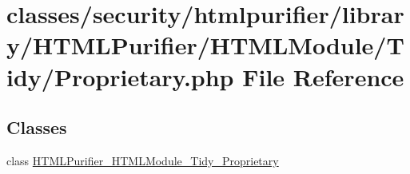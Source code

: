 \hypertarget{Tidy_2Proprietary_8php}{\section{classes/security/htmlpurifier/library/\+H\+T\+M\+L\+Purifier/\+H\+T\+M\+L\+Module/\+Tidy/\+Proprietary.php File Reference}
\label{Tidy_2Proprietary_8php}
}
\subsection*{Classes}
\begin{DoxyCompactItemize}
\item 
class \hyperlink{classHTMLPurifier__HTMLModule__Tidy__Proprietary}{H\+T\+M\+L\+Purifier\+\_\+\+H\+T\+M\+L\+Module\+\_\+\+Tidy\+\_\+\+Proprietary}
\end{DoxyCompactItemize}
